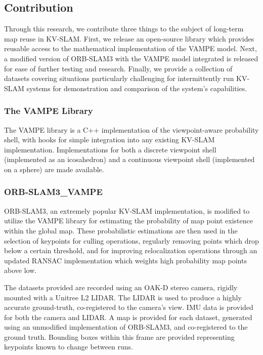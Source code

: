 \subsection{Contribution}

Through this research, we contribute three things to the subject of long-term map reuse in KV-SLAM. First, we release an open-source library which provides reusable access to the mathematical implementation of the VAMPE model. Next, a modified version of ORB-SLAM3 with the VAMPE model integrated is released for ease of further testing and research. Finally, we provide a collection of datasets covering situations particularly challenging for intermittently run KV-SLAM systems for demonstration and comparison of the system's capabilities.

\subsubsection{The VAMPE Library}
The VAMPE library is a C++ implementation of the viewpoint-aware probability shell, with hooks for simple integration into any existing KV-SLAM implementation. Implementations for both a discrete viewpoint shell (implemented as an icosahedron) and a continuous viewpoint shell (implemented on a sphere) are made available.

\subsubsection{ORB-SLAM3\_VAMPE}
ORB-SLAM3, an extremely popular KV-SLAM implementation, is modified to utilize the VAMPE library for estimating the probability of map point existence within the global map. These probabilistic estimations are then used in the selection of keypoints for culling operations, regularly removing points which drop below a certain threshold, and for improving relocalization operations through an updated RANSAC implementation which weights high probability map points above low.


The datasets provided are recorded using an OAK-D stereo camera, rigidly mounted with a Unitree L2 LIDAR. The LIDAR is used to produce a highly accurate ground-truth, co-registered to the camera's view. IMU data is provided for both the camera and LIDAR. A map is provided for each dataset, generated using an unmodified implementation of ORB-SLAM3, and co-registered to the ground truth. Bounding boxes within this frame are provided representing keypoints known to change between runs.
